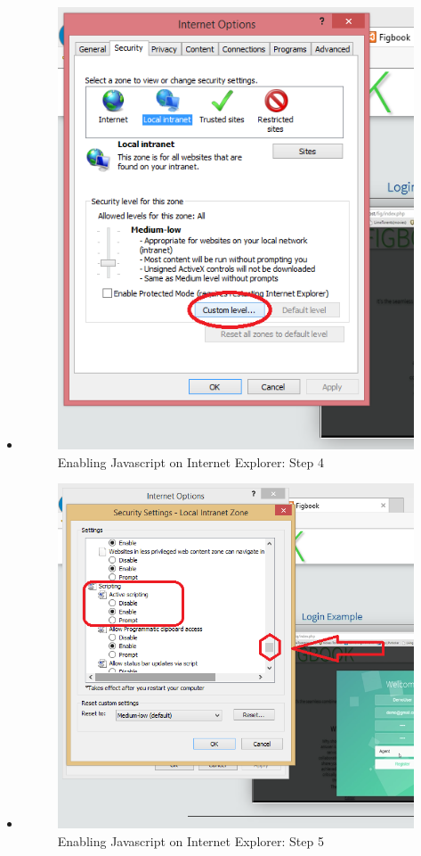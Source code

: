 \begin{itemize}
\item	\begin{figure}[!h]
		\centering
			\includegraphics[scale=0.5]{images/javascriptIE4.png}
			\caption{Enabling Javascript on Internet Explorer: Step 4}
		\end{figure}
		
\item		\begin{figure}[!h]
		\centering
			\includegraphics[scale=0.5]{images/javascriptIE5.png}
			\caption{Enabling Javascript on Internet Explorer: Step 5}
		\end{figure}
\end{itemize}